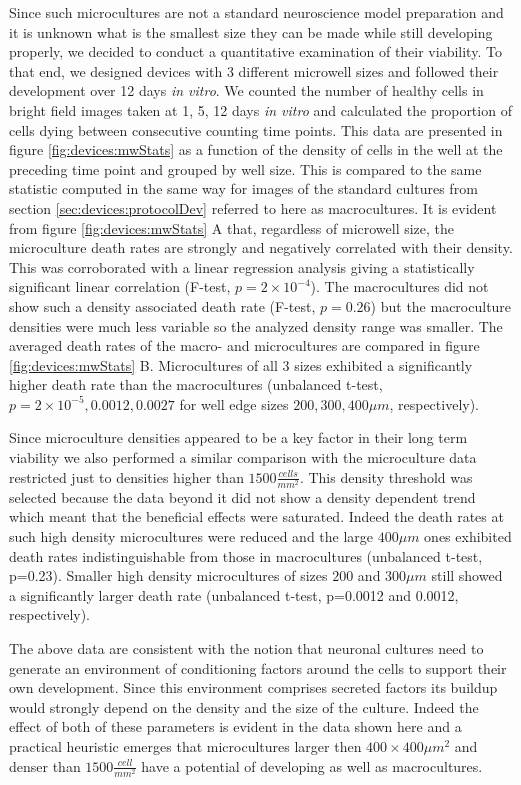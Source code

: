         Since such microcultures are not a standard neuroscience model preparation and it is unknown what is the smallest size they can be made while still developing properly, we decided to conduct a quantitative examination of their viability. To that end, we designed devices with 3 different microwell sizes and followed their development over 12 days \textit{in vitro}. We counted the number of healthy cells in bright field images taken at 1, 5, 12 days \textit{in vitro} and calculated the proportion of cells dying between consecutive counting time points. This data are presented in figure \ref{fig:devices:mwStats} as a function of the density of cells in the well at the preceding time point and grouped by well size. This is compared to the same statistic computed in the same way for images of the standard cultures from section \ref{sec:devices:protocolDev} referred to here as macrocultures. It is evident from figure \ref{fig:devices:mwStats} A that, regardless of microwell size, the microculture death rates are strongly and negatively correlated with their density. This was corroborated with a linear regression analysis giving a statistically significant linear correlation (F-test, \(p=2\times10^{-4}\)). The macrocultures did not show such a density associated death rate (F-test, \(p=0.26\)) but the macroculture densities were much less variable so the analyzed density range was smaller. The averaged death rates of the macro- and microcultures are compared in figure \ref{fig:devices:mwStats} B. Microcultures of all 3 sizes exhibited a significantly higher death rate than the macrocultures (unbalanced t-test, \(p=2\times10^{-5}, 0.0012, 0.0027\) for well edge sizes \(200,300,400 \mu m\), respectively).

        Since microculture densities appeared to be a key factor in their long term viability we also performed a similar comparison with the microculture data restricted just to densities higher than \(1500\frac{cells}{mm^2}\). This density threshold was selected because the data beyond it did not show a density dependent trend which meant that the beneficial effects were saturated. Indeed the death rates at such high density microcultures were reduced and the large \(400 \mu m\) ones exhibited death rates indistinguishable from those in macrocultures (unbalanced t-test, p=0.23). Smaller high density microcultures of sizes \(200\) and \(300 \mu m\) still showed a significantly larger death rate (unbalanced t-test, p=0.0012 and 0.0012, respectively).

        The above data are consistent with the notion that neuronal cultures need to generate an environment of conditioning factors around the cells to support their own development. Since this environment comprises secreted factors its buildup would strongly depend on the density and the size of the culture. Indeed the effect of both of these parameters is evident in the data shown here and a practical heuristic emerges that microcultures larger then \(400\times400 \mu m^2\) and denser than \(1500 \frac{cell}{mm^2}\) have a potential of developing as well as macrocultures.

